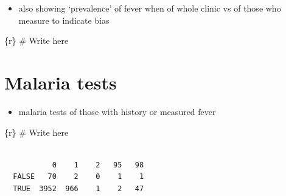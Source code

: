 \documentclass[
  letterpaper,
  DIV=11,
  numbers=noendperiod,
  oneside]{scrreprt}
\newenvironment{Shaded}{\begin{snugshade}}{\end{snugshade}}
\newcommand{\CommentTok}[1]{\textcolor[rgb]{0.37,0.37,0.37}{#1}}
\newcommand{\FunctionTok}[1]{\textcolor[rgb]{0.28,0.35,0.67}{#1}}
\newcommand{\InformationTok}[1]{\textcolor[rgb]{0.37,0.37,0.37}{#1}}
\newcommand{\NormalTok}[1]{\textcolor[rgb]{0.00,0.23,0.31}{#1}}
\newcommand{\SpecialCharTok}[1]{\textcolor[rgb]{0.37,0.37,0.37}{#1}}
\providecommand{\tightlist}{%
  \setlength{\itemsep}{0pt}\setlength{\parskip}{0pt}}\usepackage{longtable,booktabs,array}
\begin{document}
\begin{itemize}
\tightlist
\item
  also showing `prevalence' of fever when of whole clinic vs of those
  who measure to indicate bias
\end{itemize}

\begin{Shaded}
\begin{Highlighting}[]
\InformationTok{\textasciigrave{}\textasciigrave{}\textasciigrave{}\{r\}}
\CommentTok{\# Write here}
\InformationTok{\textasciigrave{}\textasciigrave{}\textasciigrave{}}
\end{Highlighting}
\end{Shaded}

\hypertarget{malaria-tests}{%
\section{Malaria tests}\label{malaria-tests}}

\begin{itemize}
\tightlist
\item
  malaria tests of those with history or measured fever
\end{itemize}

\begin{Shaded}
\begin{Highlighting}[]
\InformationTok{\textasciigrave{}\textasciigrave{}\textasciigrave{}\{r\}}
\CommentTok{\# Write here}
\InformationTok{\textasciigrave{}\textasciigrave{}\textasciigrave{}}
\end{Highlighting}
\end{Shaded}

\begin{Shaded}
\end{Shaded}

\begin{verbatim}
       
           0    1    2   95   98
  FALSE   70    2    0    1    1
  TRUE  3952  966    1    2   47
\end{verbatim}

\begin{Shaded}
\end{Shaded}
\end{document}
